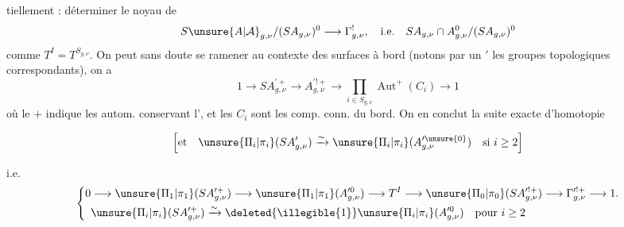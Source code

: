 tiellement : déterminer le noyau de
\[
S\unsure{A|\mathcal A}_{g,\nu}/(SA_{g,\nu})^0\longrightarrow\Gamma^!_{g,\nu},
\quad\text{i.e.}\quad
SA_{g,\nu}\cap A_{g,\nu}^0/(SA_{g,\nu})^0
\]
comme $T^I=T^{S_{g,\nu}}$. On peut sans doute se ramener au contexte des surfaces  à bord (notons par un $'$ les groupes topologiques correspondants), on a
\[
1\longrightarrow SA_{g,\nu}^{\prime+}\longrightarrow
A_{g,\nu}^{\prime!+}\longrightarrow
\prod_{i\in S_{g,\nu}}\operatorname{Aut}^+(C_i)\longrightarrow1
\]
où le $+$ indique les autom. conservant l', et les $C_i$ sont les comp. conn. du bord. On en conclut la suite exacte d'homotopie
\begin{landscape}
\begin{center}
\end{center}
\end{landscape}
\[
\left[\text{et}\quad
\unsure{\Pi_i|\pi_i}(SA'_{g,\nu})\xrightarrow{\sim}
\unsure{\Pi_i|\pi_i}(A_{g,\nu}^{\prime\unsure{0}})
\quad\text{si }i\geq2\right]
\]

i.e.
\[
\left\{\begin{aligned}
0&\longrightarrow\unsure{\Pi_1|\pi_1}(SA_{g,\nu}^{\prime+})
\longrightarrow\unsure{\Pi_1|\pi_1}(A_{g,\nu}^{\prime0})
\longrightarrow T^I\longrightarrow\unsure{\Pi_0|\pi_0}(SA_{g,\nu}^{\prime!+})
\longrightarrow\Gamma_{g,\nu}^{\prime!+}\longrightarrow1.\\
&\unsure{\Pi_i|\pi_i}(SA_{g,\nu}^{\prime+})\xrightarrow{\sim}
\deleted{\illegible{1}}\unsure{\Pi_i|\pi_i}(A_{g,\nu}^{\prime0})
\quad\text{pour }i\geq2
\end{aligned}\right.
\]

